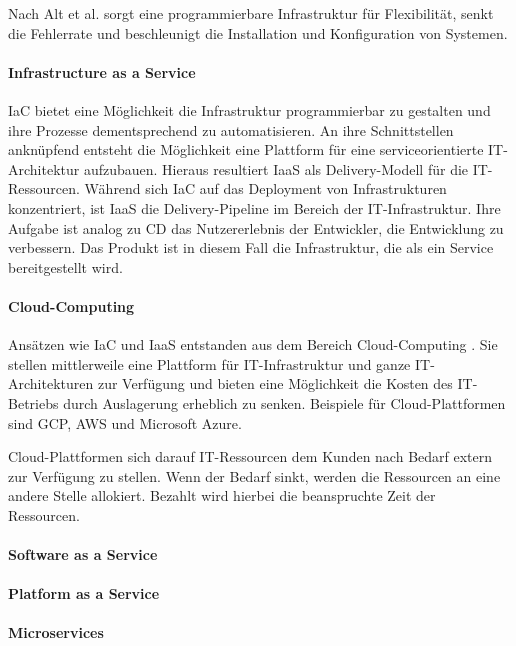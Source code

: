 Nach Alt et al. \cite{Alt2017} sorgt eine programmierbare Infrastruktur für Flexibilität, senkt die Fehlerrate und beschleunigt die Installation und Konfiguration von Systemen.

\paragraph{Infrastructure as a Service}
\ac{IaC} bietet eine Möglichkeit die Infrastruktur programmierbar zu gestalten und ihre Prozesse dementsprechend zu automatisieren. An ihre Schnittstellen anknüpfend entsteht die Möglichkeit eine Plattform für eine serviceorientierte IT-Architektur aufzubauen. Hieraus resultiert \ac{IaaS} als Delivery-Modell \cite{Alt2017} für die IT-Ressourcen. Während sich \ac{IaC} auf das Deployment von Infrastrukturen konzentriert, ist \ac{IaaS} die Delivery-Pipeline im Bereich der IT-Infrastruktur. Ihre Aufgabe ist analog zu \ac{CD} das Nutzererlebnis der Entwickler, die Entwicklung zu verbessern. Das Produkt ist in diesem Fall die Infrastruktur, die als ein Service bereitgestellt wird.

\paragraph{Cloud-Computing}
Ansätzen wie \ac{IaC} und \ac{IaaS} entstanden aus dem Bereich Cloud-Computing \cite{Alt2017}. Sie stellen mittlerweile eine Plattform für IT-Infrastruktur und ganze IT-Architekturen zur Verfügung und bieten eine Möglichkeit die Kosten des IT-Betriebs durch Auslagerung erheblich zu senken. Beispiele für Cloud-Plattformen sind \ac{GCP}, \ac{AWS} und Microsoft Azure.

Cloud-Plattformen sich darauf IT-Ressourcen dem Kunden nach Bedarf extern zur Verfügung zu stellen. Wenn der Bedarf sinkt, werden die Ressourcen an eine andere Stelle allokiert. Bezahlt wird hierbei die beanspruchte Zeit der Ressourcen. 


\paragraph{Software as a Service}

\paragraph{Platform as a Service}

\paragraph{Microservices}

